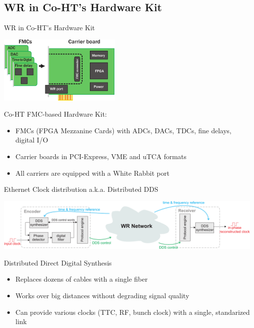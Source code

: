 \documentclass[xcolor=dvipsnames]{beamer}
\begin{document}
\subsection{WR in Co-HT's Hardware Kit}
\begin{frame}{WR in Co-HT's Hardware Kit}
\begin{center}

  \includegraphics[width=6cm]{../../figures/node/shw_kit}

  \begin{block}{Co-HT FMC-based Hardware Kit:}
    \begin{itemize}
    \item FMCs (FPGA Mezzanine Cards) with ADCs, DACs, TDCs, fine delays, digital I/O
    \item Carrier boards in PCI-Express, VME and uTCA formats
    \item All carriers are equipped with a White Rabbit port
    \end{itemize}
  \end{block}

\end{center}
\end{frame}


\begin{frame}{Ethernet Clock distribution a.k.a. Distributed DDS}
  \begin{center}
    \includegraphics[width=\columnwidth]{../../figures/applications/remote_dds.pdf}
  \end{center}
  \begin{block}{Distributed Direct Digital Synthesis}
    \begin{itemize}
    \item Replaces dozens of cables with a single fiber
    \item Works over big distances without degrading signal quality
    \item Can provide various clocks (TTC, RF, bunch clock) with a single, standarized link
    \end{itemize}
  \end{block}
\end{frame}
\end{document}
